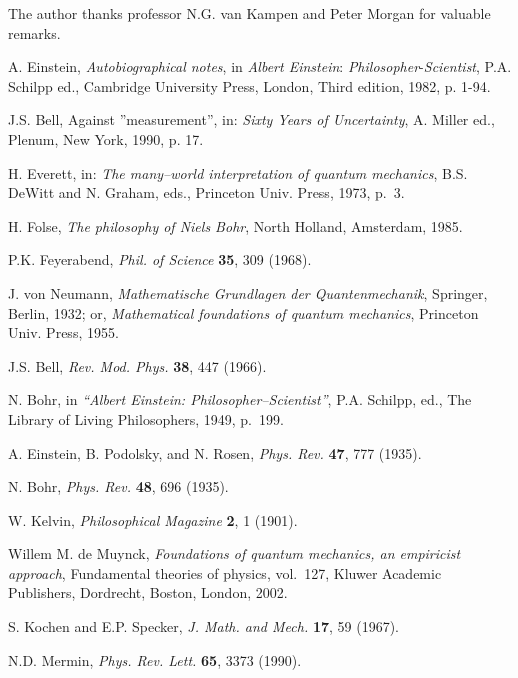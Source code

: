 \documentclass[12pt]{article}
\begin{document}
\noindent The author thanks professor N.G. van Kampen and Peter
Morgan for valuable remarks.



%

\begin{thebibliography}{10}

{A. Einstein, {\em Autobiographical notes}, in {\em Albert Einstein}: {\em
  Philosopher}-{\em Scientist}, P.A. Schilpp ed., Cambridge University Press,
  London, Third edition, 1982, p. 1-94.}

{J.S. Bell, Against ''measurement'', in: {\em Sixty Years of Uncertainty}, A.
  Miller ed., Plenum, New York, 1990, p. 17.}

{H. Everett, in: {\em The many--world interpretation of quantum mechanics},
  B.S. DeWitt and N. Graham, eds., Princeton Univ. Press, 1973, p.~3.}

{H. Folse, {\em The philosophy of Niels Bohr}, North Holland, Amsterdam, 1985.}

{P.K. Feyerabend, {\em Phil. of Science} {\bf 35}, 309 (1968).}

{J. von Neumann, {\em Mathematische Grundlagen der Quantenmechanik}, Springer,
  Berlin, 1932; or, {\em Mathematical foundations of quantum mechanics},
  Princeton Univ. Press, 1955.}

{J.S. Bell, {\em Rev. Mod. Phys.} {\bf 38}, 447 (1966).}

{N. Bohr, in {\em ``Albert Einstein: Philosopher--Scientist''}, P.A. Schilpp,
  ed., The Library of Living Philosophers, 1949, p.~199.}

{A. Einstein, B. Podolsky, and N. Rosen, {\em Phys. Rev.} {\bf 47}, 777
  (1935).}

{N. Bohr, {\em Phys. Rev.} {\bf 48}, 696 (1935).}

{W. Kelvin, {\em Philosophical Magazine} {\bf 2}, 1 (1901).}

{Willem M. de Muynck, {\em Foundations of quantum mechanics, an empiricist
  approach}, Fundamental theories of physics, vol.~127, Kluwer Academic
  Publishers, Dordrecht, Boston, London, 2002.}

{S. Kochen and E.P. Specker, {\em J. Math. and Mech.} {\bf 17}, 59 (1967).}

{N.D. Mermin, {\em Phys. Rev. Lett.} {\bf 65}, 3373 (1990).}


\end{thebibliography}
\end{document}
